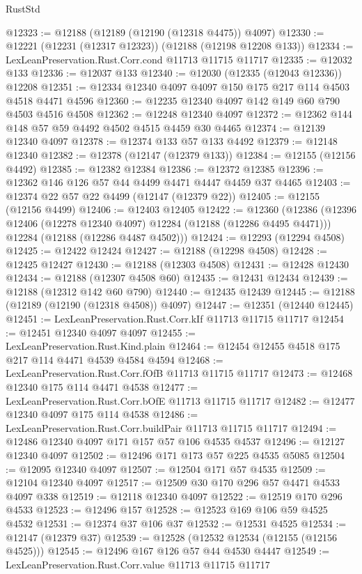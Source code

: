 \begin{lexlean}{RustStd}
\begin{coremodule}
@12323 := @12188 (@12189 (@12190 (@12318 @4475)) @4097)
@12330 := @12221 (@12231 (@12317 @12323)) (@12188 (@12198 @12208 @133))
@12334 := LexLeanPreservation.Rust.Corr.cond @11713 @11715 @11717
@12335 := @12032 @133
@12336 := @12037 @133
@12340 := @12030 (@12335 (@12043 @12336)) @12208
@12351 := @12334 @12340 @4097 @4097 @150 @175 @217 @114 @4503 @4518 @4471 @4596
@12360 := @12235 @12340 @4097 @142 @149 @60 @790 @4503 @4516 @4508
@12362 := @12248 @12340 @4097
@12372 := @12362 @144 @148 @57 @59 @4492 @4502 @4515 @4459 @30 @4465
@12374 := @12139 @12340 @4097
@12378 := @12374 @133 @57 @133 @4492
@12379 := @12148 @12340
@12382 := @12378 (@12147 (@12379 @133))
@12384 := @12155 (@12156 @4492)
@12385 := @12382 @12384
@12386 := @12372 @12385
@12396 := @12362 @146 @126 @57 @44 @4499 @4471 @4447 @4459 @37 @4465
@12403 := @12374 @22 @57 @22 @4499 (@12147 (@12379 @22))
@12405 := @12155 (@12156 @4499)
@12406 := @12403 @12405
@12422 := @12360
    (@12386
      (@12396 @12406 (@12278 @12340 @4097) @12284 (@12188 (@12286 @4495 @4471)))
      @12284
      (@12188 (@12286 @4487 @4502)))
@12424 := @12293 (@12294 @4508)
@12425 := @12422 @12424
@12427 := @12188 (@12298 @4508)
@12428 := @12425 @12427
@12430 := @12188 (@12303 @4508)
@12431 := @12428 @12430
@12434 := @12188 (@12307 @4508 @60)
@12435 := @12431 @12434
@12439 := @12188 (@12312 @142 @60 @790)
@12440 := @12435 @12439
@12445 := @12188 (@12189 (@12190 (@12318 @4508)) @4097)
@12447 := @12351 (@12440 @12445)
@12451 := LexLeanPreservation.Rust.Corr.kIf @11713 @11715 @11717
@12454 := @12451 @12340 @4097 @4097
@12455 := LexLeanPreservation.Rust.Kind.plain
@12464 := @12454 @12455 @4518 @175 @217 @114 @4471 @4539 @4584 @4594
@12468 := LexLeanPreservation.Rust.Corr.fOfB @11713 @11715 @11717
@12473 := @12468 @12340 @175 @114 @4471 @4538
@12477 := LexLeanPreservation.Rust.Corr.bOfE @11713 @11715 @11717
@12482 := @12477 @12340 @4097 @175 @114 @4538
@12486 := LexLeanPreservation.Rust.Corr.buildPair @11713 @11715 @11717
@12494 := @12486 @12340 @4097 @171 @157 @57 @106 @4535 @4537
@12496 := @12127 @12340 @4097
@12502 := @12496 @171 @173 @57 @225 @4535 @5085
@12504 := @12095 @12340 @4097
@12507 := @12504 @171 @57 @4535
@12509 := @12104 @12340 @4097
@12517 := @12509 @30 @170 @296 @57 @4471 @4533 @4097 @338
@12519 := @12118 @12340 @4097
@12522 := @12519 @170 @296 @4533
@12523 := @12496 @157
@12528 := @12523 @169 @106 @59 @4525 @4532
@12531 := @12374 @37 @106 @37
@12532 := @12531 @4525
@12534 := @12147 (@12379 @37)
@12539 := @12528 (@12532 @12534 (@12155 (@12156 @4525)))
@12545 := @12496 @167 @126 @57 @44 @4530 @4447
@12549 := LexLeanPreservation.Rust.Corr.value @11713 @11715 @11717

\end{coremodule}
\end{lexlean}
